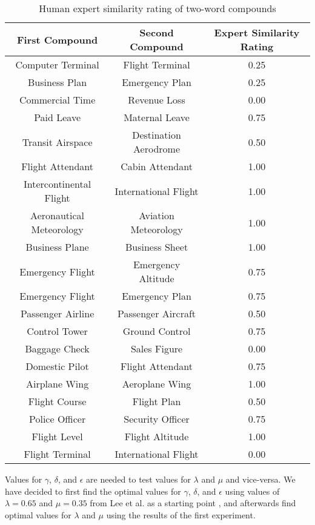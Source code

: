 \documentclass{article}
\begin{document}
\begin{table}[h!]
\centering
\begin{tabular}{|c|c||c|}
	\hline
	First Compound & Second Compound & Expert Similarity Rating \\
	\hline
	Computer Terminal & Flight Terminal & 0.25 \\
	Business Plan & Emergency Plan & 0.25 \\
	Commercial Time & Revenue Loss & 0.00 \\
	Paid Leave & Maternal Leave & 0.75 \\
	Transit Airspace & Destination Aerodrome & 0.50 \\
	Flight Attendant & Cabin Attendant & 1.00 \\
	Intercontinental Flight & International Flight & 1.00 \\
	Aeronautical Meteorology & Aviation Meteorology & 1.00 \\
	Business Plane & Business Sheet & 1.00 \\
	Emergency Flight & Emergency Altitude & 0.75 \\
	Emergency Flight & Emergency Plan & 0.75 \\
	Passenger Airline & Passenger Aircraft & 0.50 \\
	Control Tower & Ground Control & 0.75 \\
	Baggage Check & Sales Figure & 0.00 \\
	Domestic Pilot & Flight Attendant & 0.75 \\
	Airplane Wing & Aeroplane Wing & 1.00 \\
	Flight Course & Flight Plan & 0.50 \\
	Police Officer & Security Officer & 0.75 \\
	Flight Level & Flight Altitude & 1.00 \\
	Flight Terminal & International Flight & 0.00 \\
	\hline
\end{tabular}
\caption{Human expert similarity rating of two-word compounds}
\label{table:humancompoundsimilarity}
\end{table}

Values for $\gamma$, $\delta$, and $\epsilon$ are needed to test values for $\lambda$ and $\mu$ and vice-versa. We have decided to first find the optimal values for $\gamma$, $\delta$, and $\epsilon$ using values of $\lambda = 0.65$ and $\mu = 0.35$ from Lee et al. as a starting point \cite{lee2016combining}, and afterwards find optimal values for $\lambda$ and $\mu$ using the results of the first experiment.
\end{document}

